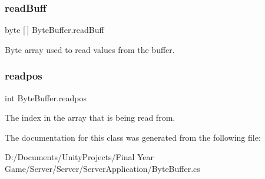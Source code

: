 \subsubsection{\texorpdfstring{readBuff}{readBuff}}
{\footnotesize\ttfamily byte \mbox{[}$\,$\mbox{]} Byte\+Buffer.\+read\+Buff\hspace{0.3cm}{\ttfamily [private]}}



Byte array used to read values from the buffer. 

\mbox{\label{class_byte_buffer_a266fa418f19f51b4929a7d38c8edef3d}} 
\subsubsection{\texorpdfstring{readpos}{readpos}}
{\footnotesize\ttfamily int Byte\+Buffer.\+readpos\hspace{0.3cm}{\ttfamily [private]}}



The index in the array that is being read from. 



The documentation for this class was generated from the following file\+:\begin{DoxyCompactItemize}
\item 
D\+:/\+Documents/\+Unity\+Projects/\+Final Year Game/\+Server/\+Server/\+Server\+Application/Byte\+Buffer.\+cs\end{DoxyCompactItemize}
